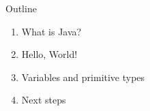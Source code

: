 \begin{frame}{Outline}
  \begin{enumerate}\setlength\itemsep{0.5em}
    \item What is Java?
    \item Hello, World!
    \item Variables and primitive types
    \item Next steps
  \end{enumerate}
\end{frame}
